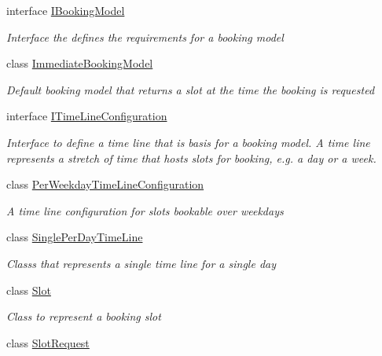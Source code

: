 \begin{DoxyCompactItemize}
interface \hyperlink{interface_general_health_care_elements_1_1_booking_models_1_1_i_booking_model}{I\+Booking\+Model}
\begin{DoxyCompactList}\small\item\em Interface the defines the requirements for a booking model \end{DoxyCompactList}\item 
class \hyperlink{class_general_health_care_elements_1_1_booking_models_1_1_immediate_booking_model}{Immediate\+Booking\+Model}
\begin{DoxyCompactList}\small\item\em Default booking model that returns a slot at the time the booking is requested \end{DoxyCompactList}\item 
interface \hyperlink{interface_general_health_care_elements_1_1_booking_models_1_1_i_time_line_configuration}{I\+Time\+Line\+Configuration}
\begin{DoxyCompactList}\small\item\em Interface to define a time line that is basis for a booking model. A time line represents a stretch of time that hosts slots for booking, e.\+g. a day or a week. \end{DoxyCompactList}\item 
class \hyperlink{class_general_health_care_elements_1_1_booking_models_1_1_per_weekday_time_line_configuration}{Per\+Weekday\+Time\+Line\+Configuration}
\begin{DoxyCompactList}\small\item\em A time line configuration for slots bookable over weekdays \end{DoxyCompactList}\item 
class \hyperlink{class_general_health_care_elements_1_1_booking_models_1_1_single_per_day_time_line}{Single\+Per\+Day\+Time\+Line}
\begin{DoxyCompactList}\small\item\em Classs that represents a single time line for a single day \end{DoxyCompactList}\item 
class \hyperlink{class_general_health_care_elements_1_1_booking_models_1_1_slot}{Slot}
\begin{DoxyCompactList}\small\item\em Class to represent a booking slot \end{DoxyCompactList}\item 
class \hyperlink{class_general_health_care_elements_1_1_booking_models_1_1_slot_request}{Slot\+Request}

\end{DoxyCompactItemize}
